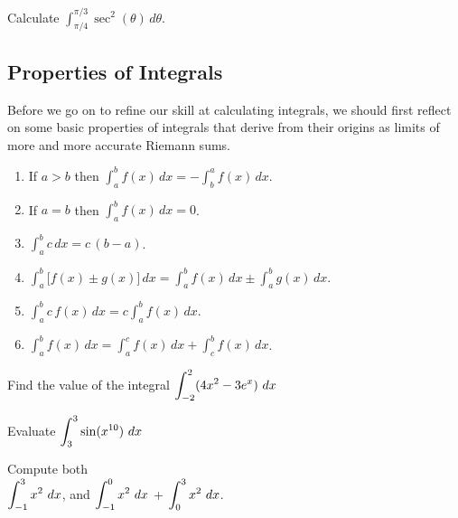 \begin{problem}
Calculate $\displaystyle \int_{\pi/4}^{\pi/3} \sec^2 (\theta) \, d \theta$.
 
\end{problem}



\newpage
{}
\subsection*{Properties of Integrals}
Before we go on to refine our skill at calculating integrals, we
should first reflect on some basic properties of integrals that
derive from their origins as limits of more and more accurate
Riemann sums.

\newpage
\begin{boxnote}
\begin{enumerate}
\item If $a>b$ then $\displaystyle \int_a^bf(x)\,dx=-\int_b^af(x)\,dx$. \\[1.5ex]
\item If $a=b$ then $\displaystyle \int_a^bf(x)\,dx=0$. \\[1.5ex]
\item $\displaystyle \int_a^bc\,dx=c\,(b-a)$. \\[1.5ex]
\item $\displaystyle \int_a^b\bigl[ f(x)\pm g(x) \bigr] \,dx=\int_a^bf(x)\,dx \pm\int_a^bg(x)\,dx$. \\[1.5ex]
\item $\displaystyle \int_a^bc\,f(x)\,dx=c\int_a^bf(x)\,dx$. \\[1.5ex]
\item $\displaystyle \int_a^bf(x)\,dx=\int_a^{c}f(x)\,dx+\int_{c}^bf(x)\,dx$.
\end{enumerate}
\end{boxnote}

\newpage

\problem Find the value of the integral $\displaystyle \int_{-2}^2 (4x^2 - 3e^{x})~dx$

\newpage

\problem Evaluate $\displaystyle \int_{3}^3 \sin(x^{10})~dx$

\newpage

\problem Compute both  \\
$\displaystyle \int_{-1}^3 x^2 ~ dx$, and \vfill $\displaystyle \int_{-1}^0 x^2 ~ dx$ +
$\displaystyle \int_{0}^3 x^2 ~ dx$.  \vfill 

